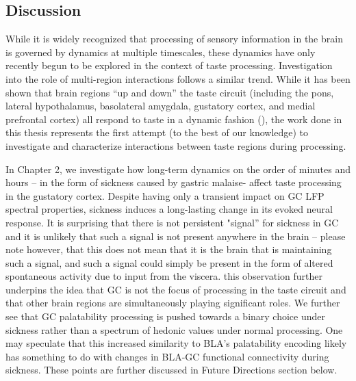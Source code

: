 \begin{refsection}

\chapter{Discussion}

While it is widely recognized that processing of sensory information in the brain is governed by dynamics at multiple timescales, these dynamics have only recently begun to be explored in the context of taste processing. Investigation into the role of multi-region interactions follows a similar trend. While it has been shown that brain regions “up and down” the taste circuit (including the pons, lateral hypothalamus, basolateral amygdala, gustatory cortex, and medial prefrontal cortex) all respond to taste in a dynamic fashion (\cite{katz2001a,fontanini2009a,jezzini2013a,li2013a,baez-santiago2016a}), the work done in this thesis represents the first attempt (to the best of our knowledge) to investigate and characterize interactions between taste regions during processing.

In Chapter 2, we investigate how long-term dynamics on the order of minutes and hours – in the form of sickness caused by gastric malaise- affect taste processing in the gustatory cortex. Despite having only a transient impact on GC LFP spectral properties, sickness induces a long-lasting change in its evoked neural response. It is surprising that there is not persistent "signal” for sickness in GC and it is unlikely that such a signal is not present anywhere in the brain – please note however, that this does not mean that it is the brain that is maintaining such a signal, and such a signal could simply be present in the form of altered spontaneous activity due to input from the viscera. this observation further underpins the idea that GC is not the focus of processing in the taste circuit and that other brain regions are simultaneously playing significant roles. We further see that GC palatability processing is pushed towards a binary choice under sickness rather than a spectrum of hedonic values under normal processing. One may speculate that this increased similarity to BLA’s palatability encoding likely has something to do with changes in BLA-GC functional connectivity during sickness. These points are further discussed in Future Directions section below.


\end{refsection}
